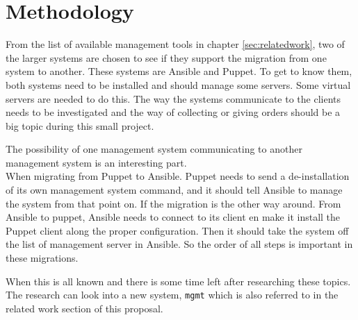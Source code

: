 \section{Methodology}\label{sec:method}
From the list of available management tools in chapter \ref{sec:relatedwork}, two of the larger systems are chosen to see if they support the migration from one system to another. These systems are Ansible\cite{whatisansible} and Puppet\cite{whatispuppet}. To get to know them, both systems need to be installed and should manage some servers. Some virtual servers are needed to do this. The way the systems communicate to the clients needs to be investigated and the way of collecting or giving orders should be a big topic during this small project. 

The possibility of one management system communicating to another management system is an interesting part. \\
When migrating from Puppet to Ansible. Puppet needs to send a de-installation of its own management system command, and it should tell Ansible to manage the system from that point on. If the migration is the other way around. From Ansible to puppet, Ansible needs to connect to its client en make it install the Puppet client along the proper configuration. Then it should take the system off the list of management server in Ansible. So the order of all steps is important in these migrations. 

When this is all known and there is some time left after researching these topics. The research can look into a new system, \texttt{mgmt} which is also referred to in the related work section of this proposal.

